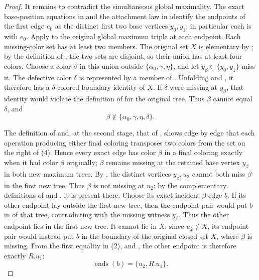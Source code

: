 \begin{proof}
It remains to contradict the simultaneous global maximality.  The exact
base-position equations in  and
the attachment law in  identify the endpoints of
the first edge $e_0$ as the distinct first two base vertices $y_0,y_1$;
in particular each is  with $e_0$.
Apply  to the original global
maximum triple at each endpoint.  Each missing-color set has at least
two members.  The original set $X$ is elementary by
; by the definition of
, the two sets are disjoint, so their
union has at least four colors.  Choose a color $\beta$ in this union
outside $\{\alpha _0,\gamma,\eta\}$, and let
$y_\beta\in\{y_0,y_1\}$ miss it.  The defective color $\delta$ is
represented by a member of .  Unfolding
 and , it therefore
has a $\delta$-colored boundary identity of $X$.  If $\delta$ were
missing at $y_\beta$, that identity would violate the definition of
 for the original tree.  Thus $\beta$
cannot equal $\delta$, and
\[
 \beta\notin\{\alpha _0,\gamma,\eta,\delta\}.                \tag{4}
\]

The definition of  and, at the second
stage, that of , shows edge by edge that
each operation producing either final coloring transposes two colors from
the set on the right of (4).  Hence every exact edge has color $\beta$ in
a final coloring exactly when it had color $\beta$ originally;
$\beta$ remains missing at the retained base vertex $y_\beta$ in both
new maximum trees.  By , the
distinct vertices $y_\beta,u_2$ cannot both miss $\beta$ in the first
new tree.  Thus $\beta$ is not missing at $u_2$; by the complementary
definitions of  and , it is
present there.  Choose its exact incident $\beta$-edge $b$.
If its other endpoint lay outside the first new tree, then the endpoint
pair would put $b$ in  of that tree, contradicting
 with the missing witness $y_\beta$.
Thus the other endpoint lies in the first new tree.  It cannot lie in
$X$: since $u_2\notin X$, its endpoint pair would instead put $b$ in the
boundary of the original closed set $X$, where $\beta$ is missing.
From the first equality in (2), and
,
the other endpoint is therefore exactly $R.u_1$:
\[
 \operatorname{ends}(b)=\{u_2,R.u_1\}.                       \tag{5}
\]


\end{proof}
